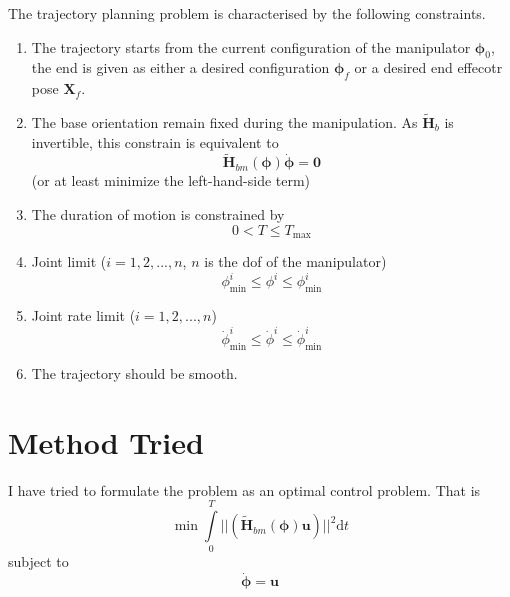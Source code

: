 \documentclass{article}
\begin{document}
The trajectory planning problem is characterised by the following constraints.
\begin{enumerate}
	\item The trajectory starts from the current configuration of the manipulator $\bm{\phi}_0$, the end is given as either a desired configuration $\bm{\phi}_f$ or a desired end effecotr pose $\bm{X}_f$.
	\item The base orientation remain fixed during the manipulation. As $\tilde{\bm{H}}_b$ is invertible, this constrain is equivalent to 
	\begin{equation}
		\tilde{\bm{H}}_{bm}(\bm{\phi})\dot{\bm{\phi}} = \bm{0}
	\end{equation}
	(or at least minimize the left-hand-side term)
	\item The duration of motion is constrained by 
	\begin{equation}
		0 < T \le T_{\mathrm{max}}
	\end{equation}
	\item Joint limit ($i = 1,2,...,n$, $n$ is the dof of the manipulator)
	\begin{equation}
		\phi^i_{\mathrm{min}} \le \phi^i \le \phi^i_{\mathrm{min}}
	\end{equation}
	\item Joint rate limit ($i = 1,2,...,n$)
		\begin{equation}
		\dot{\phi}^i_{\mathrm{min}} \le \dot{\phi}^i \le \dot{\phi}^i_{\mathrm{min}}
		\end{equation}
	\item The trajectory should be smooth.
\end{enumerate}

\section{Method Tried}
	I have tried to formulate the problem as an optimal control problem. That is 
	\begin{equation}
	\label{e:min}
		\min\int\limits_0^T||(\tilde{\bm{H}}_{bm}(\bm{\phi})\bm{u})||^2\mathrm{d}t
	\end{equation}
	subject to
	\begin{equation}
		\dot{\bm{\phi}} = \bm{u}
	\end{equation}
	
\end{document}
